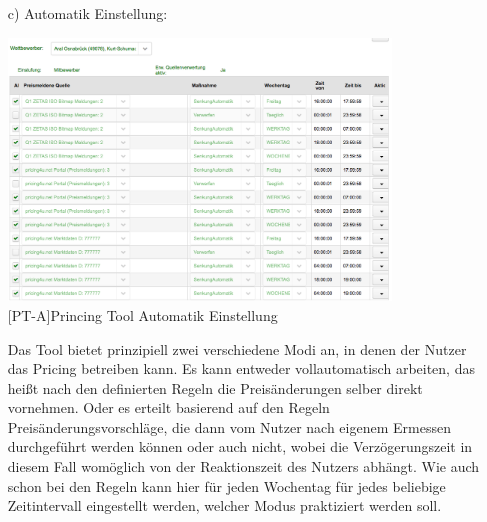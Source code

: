 \documentclass[12pt,a4paper,bibliography=totocnumbered,listof=totocnumbered]{scrartcl}
\begin{document}
\begin{enumerate}
\item[c)] Automatik Einstellung:\\
\begin{center}
	\includegraphics[width=0.8\textwidth, draft]{Bilder/automatik.png}\\
	[PT-A]{Princing Tool Automatik Einstellung}
	\label{fig:PT-A}
\end{center}                                                                          
Das Tool bietet prinzipiell zwei verschiedene Modi an, in denen der Nutzer das Pricing betreiben kann. Es kann entweder vollautomatisch arbeiten, das heißt nach den definierten Regeln die Preisänderungen selber direkt vornehmen. Oder es erteilt basierend auf den Regeln Preisänderungsvorschläge, die dann vom Nutzer nach eigenem Ermessen durchgeführt werden können oder auch nicht, wobei die Verzögerungszeit in diesem Fall womöglich von der Reaktionszeit des Nutzers abhängt. Wie auch schon bei den Regeln kann hier für jeden Wochentag für jedes beliebige Zeitintervall eingestellt werden, welcher Modus praktiziert werden soll.
\end{enumerate}




\end{document}
